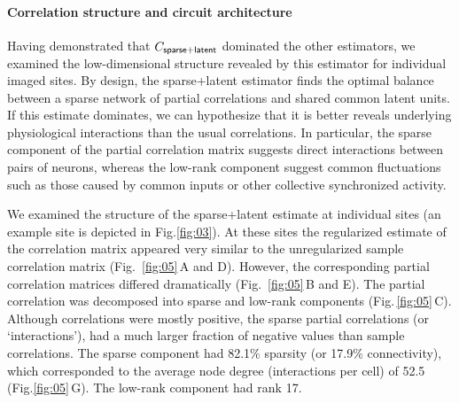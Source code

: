 \documentclass[10pt]{article}
\begin{document}
\paragraph{Correlation structure and circuit architecture}
Having demonstrated that $C_{\sf sparse+latent}$ dominated the other estimators, we examined the low-dimensional structure revealed by this estimator for individual imaged sites. By design, the sparse+latent estimator finds the optimal balance between a sparse network of partial correlations and shared common latent units. If this estimate dominates, we can hypothesize that it is better reveals underlying physiological interactions than the usual correlations. In particular, the sparse component of the partial correlation matrix suggests direct interactions between pairs of neurons, whereas the low-rank component suggest common fluctuations such as those caused by common inputs or other collective synchronized activity. 

We examined the structure of the sparse+latent estimate at individual sites (an example site is depicted in Fig.\;\ref{fig:03}). At these sites the regularized estimate of the correlation matrix appeared very similar to the unregularized sample correlation matrix (Fig.~\ref{fig:05}\,A and D). However, the corresponding partial correlation matrices differed dramatically (Fig.~\ref{fig:05}\,B and E). The partial correlation was decomposed into sparse and low-rank components (Fig.\,\ref{fig:05}\,C). Although correlations were mostly positive, the sparse partial correlations (or `interactions'), had a much larger fraction of negative values than sample correlations. The sparse component had 82.1\% sparsity (or 17.9\% connectivity), which corresponded to the average node degree (interactions per cell) of 52.5 (Fig.\;\ref{fig:05}\,G). The low-rank component had rank 17.
\end{document}
